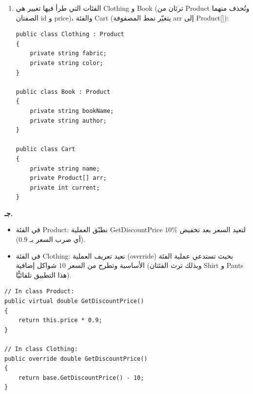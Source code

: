 \begin{boxSolution}
\begin{enumerate}[label=\textbf{(\arabic*)}, start=3]
    \item الفئات التي طرأ فيها تغيير هي \textenglish{Clothing} و \textenglish{Book} (ترثان من \textenglish{Product} وتُحذف منهما الصفتان \textenglish{id} و \textenglish{price})، والفئة \textenglish{Cart} (يتغيّر نمط المصفوفة \textenglish{arr} إلى \textenglish{Product[]}):
\begin{boxCode}
\begin{english}
\begin{verbatim}
public class Clothing : Product
{
    private string fabric;
    private string color;
}

public class Book : Product
{
    private string bookName;
    private string author;
}

public class Cart
{
    private string name;
    private Product[] arr;
    private int current;
}
\end{verbatim}
\end{english}
\end{boxCode}
\end{enumerate}
\end{boxSolution}

\filbreak

\begin{boxSolution}
\textbf{جـ.}
\begin{itemize}[itemsep=0.4em]
    \item في الفئة \textenglish{Product}: نطبّق العملية \textenglish{GetDiscountPrice} لتعيد السعر بعد تخفيض $10\%$ (أي ضرب السعر بـ $0.9$).
    \item في الفئة \textenglish{Clothing}: نعيد تعريف العملية (\textenglish{override}) بحيث تستدعي عملية الفئة الأساسية وتطرح من السعر $10$ شواكل إضافية (وبذلك ترث الفئتان \textenglish{Shirt} و \textenglish{Pants} هذا التطبيق تلقائيًّا).
\end{itemize}
\begin{boxCode}
\begin{english}
\begin{verbatim}
// In class Product:
public virtual double GetDiscountPrice()
{
    return this.price * 0.9;
}

// In class Clothing:
public override double GetDiscountPrice()
{
    return base.GetDiscountPrice() - 10;
}
\end{verbatim}
\end{english}
\end{boxCode}
\end{boxSolution}
\fi
\filbreak
